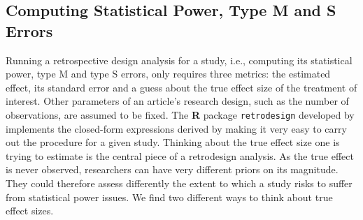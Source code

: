 \documentclass[12pt]{article}
\begin{document}
    \subsection{Computing Statistical Power, Type M and S Errors}

    Running a retrospective design analysis for a study, i.e., computing its statistical power, type M and type S errors, only requires three metrics: the estimated effect, its standard error and a guess about the true effect size of the treatment of interest. Other parameters of an article's research design, such as the number of observations, are assumed to be fixed. The \textbf{\textsf{R}} package \texttt{retrodesign} developed by \cite{timm_retrodesign_2019} implements the closed-form expressions derived by \cite{lu_note_2019} making it very easy to carry out the procedure for a given study. Thinking about the true effect size one is trying to estimate is the central piece of a retrodesign analysis. As the true effect is never observed, researchers can have very different priors on its magnitude. They could therefore assess differently the extent to which a study risks to suffer from statistical power issues. We find two different ways to think about true effect sizes.
\end{document}
